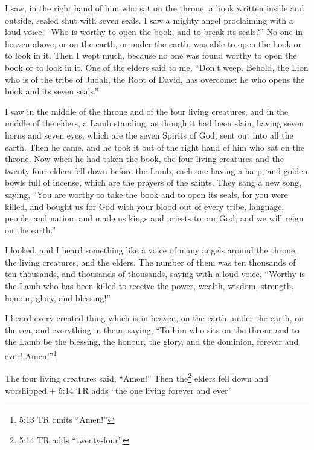  I saw, in the right hand of him who sat on the throne, a
book written inside and outside, sealed shut with seven seals.
 I saw a mighty angel proclaiming with a loud voice, ``Who
is worthy to open the book, and to break its seals?''  No
one in heaven above, or on the earth, or under the earth, was able to
open the book or to look in it.  Then I wept much, because
no one was found worthy to open the book or to look in it. 
One of the elders said to me, ``Don't weep. Behold, the Lion who is of
the tribe of Judah, the Root of David, has overcome: he who opens the
book and its seven seals.''

 I saw in the middle of the throne and of the four living
creatures, and in the middle of the elders, a Lamb standing, as though
it had been slain, having seven horns and seven eyes, which are the
seven Spirits of God, sent out into all the earth.  Then he
came, and he took it out of the right hand of him who sat on the throne.
 Now when he had taken the book, the four living creatures
and the twenty-four elders fell down before the Lamb, each one having a
harp, and golden bowls full of incense, which are the prayers of the
saints.  They sang a new song, saying, ``You are worthy to
take the book and to open its seals, for you were killed, and bought us
for God with your blood out of every tribe, language, people, and
nation,  and made us kings and priests to our God; and we
will reign on the earth.''

 I looked, and I heard something like a voice of many
angels around the throne, the living creatures, and the elders. The
number of them was ten thousands of ten thousands, and thousands of
thousands,  saying with a loud voice, ``Worthy is the Lamb
who has been killed to receive the power, wealth, wisdom, strength,
honour, glory, and blessing!''

 I heard every created thing which is in heaven, on the
earth, under the earth, on the sea, and everything in them, saying, ``To
him who sits on the throne and to the Lamb be the blessing, the honour,
the glory, and the dominion, forever and ever! Amen!''\footnote{5:13 TR
  omits ``Amen!''}

 The four living creatures said, ``Amen!'' Then
the\footnote{5:14 TR adds ``twenty-four''} elders fell down and
worshipped.+ 5:14 TR adds ``the one living forever and ever''


